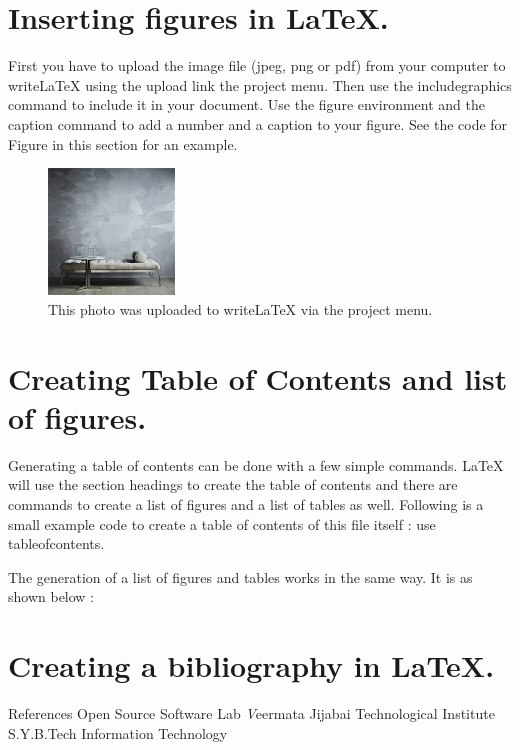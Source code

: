 \documentclass[a4paper]{article}
\begin{document}
\section{Inserting figures in LaTeX.}
First you have to upload the image file (jpeg, png or pdf) from your computer to writeLaTeX using the upload link the project menu. Then use the includegraphics command to include it in your document. Use the figure environment and the caption command to add a number and a caption to your figure. See the code for Figure in this section for an example.
\begin{figure}
\centering
\includegraphics[width=0.3\textwidth]{Mettaliceffect.jpg}
\caption{\label{fig:Enthusia}This photo was uploaded to writeLaTeX via the project menu.}
\end{figure}

\section{Creating Table of Contents and list of figures.}
Generating a table of contents can be done with a few simple commands. LaTeX will use the section headings to create the table of contents and there are commands to create a list of figures and a list of tables as well. Following is a small example code to create a table of contents of this file itself :
use tableofcontents.


The generation of a list of figures and tables works in the same way. It is as shown below :

\begin{figure}
  \caption{}
\end{figure}

  \listoffigures
  \listoftables

\section{Creating a bibliography in LaTeX.}

\begin{bibliography}{9}
\boldsymbol References
Open Source Software Lab
\newline
\emph Veermata Jijabai Technological Institute
\newline
S.Y.B.Tech Information Technology
\end{bibliography}
\end{document}

